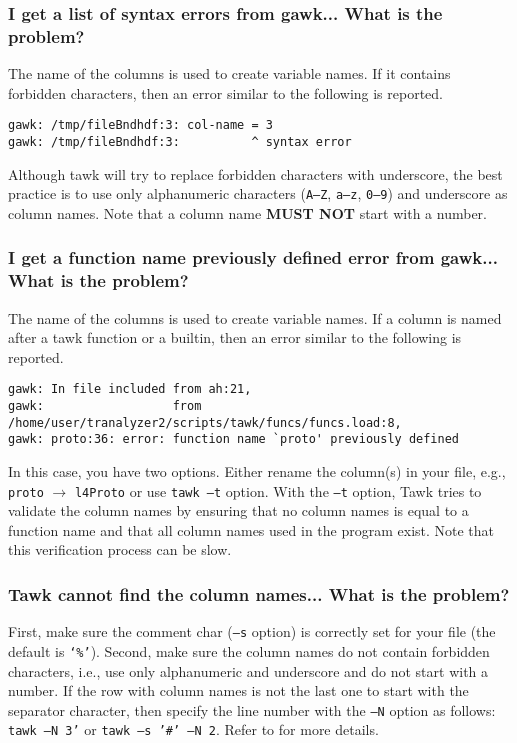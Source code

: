 \documentclass[documentation]{subfiles}
\begin{document}
\subsubsection{I get a list of syntax errors from gawk... What is the problem?}
The name of the columns is used to create variable names.
If it contains forbidden characters, then an error similar to the following is reported.
\begin{verbatim}
gawk: /tmp/fileBndhdf:3: col-name = 3
gawk: /tmp/fileBndhdf:3:          ^ syntax error
\end{verbatim}
Although tawk will try to replace forbidden characters with underscore, the best practice is to use only alphanumeric characters ({\tt A--Z}, {\tt a--z}, {\tt 0--9}) and underscore as column names.
Note that a column name {\bf MUST NOT} start with a number.

\subsubsection{I get a function name previously defined error from gawk... What is the problem?}
The name of the columns is used to create variable names.
If a column is named after a tawk function or a builtin, then an error similar to the following is reported.
\begin{verbatim}
gawk: In file included from ah:21,
gawk:                  from /home/user/tranalyzer2/scripts/tawk/funcs/funcs.load:8,
gawk: proto:36: error: function name `proto' previously defined
\end{verbatim}
In this case, you have two options. Either rename the column(s) in your file, e.g., {\tt proto} $\rightarrow$ {\tt l4Proto} or use {\tt tawk --t} option.
With the {\tt --t} option, Tawk tries to validate the column names by ensuring that no column names is equal to a function name and that all column names used in the program exist.
Note that this verification process can be slow.

\subsubsection{Tawk cannot find the column names... What is the problem?}
First, make sure the comment char ({\tt --s} option) is correctly set for your file (the default is {\tt `\%'}).
Second, make sure the column names do not contain forbidden characters, i.e., use only alphanumeric and underscore and do not start with a number.
If the row with column names is not the last one to start with the separator character, then specify the line number with the {\tt --N} option as follows:
{\tt tawk --N 3'} or {\tt tawk --s '\#' --N 2}.
Refer to  for more details.
\end{document}
